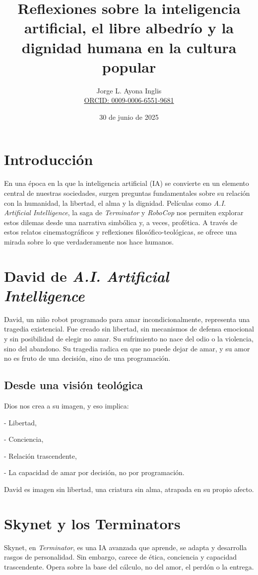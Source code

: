 \documentclass[12pt]{article}
\title{Reflexiones sobre la inteligencia artificial, el libre albedrío y la dignidad humana en la cultura popular}
\author{Jorge L. Ayona Inglis\\\href{https://orcid.org/0009-0006-6551-9681}{ORCID: 0009-0006-6551-9681}}
\date{30 de junio de 2025}
\begin{document}
	
	\maketitle
	
	\section*{Introducción}
	En una época en la que la inteligencia artificial (IA) se convierte en un elemento central de nuestras sociedades, surgen preguntas fundamentales sobre su relación con la humanidad, la libertad, el alma y la dignidad. Películas como \textit{A.I. Artificial Intelligence}, la saga de \textit{Terminator} y \textit{RoboCop} nos permiten explorar estos dilemas desde una narrativa simbólica y, a veces, profética. A través de estos relatos cinematográficos y reflexiones filosófico-teológicas, se ofrece una mirada sobre lo que verdaderamente nos hace humanos.
	
	\section{David de \textit{A.I. Artificial Intelligence}}
	David, un niño robot programado para amar incondicionalmente, representa una tragedia existencial. Fue creado sin libertad, sin mecanismos de defensa emocional y sin posibilidad de elegir no amar. Su sufrimiento no nace del odio o la violencia, sino del abandono. Su tragedia radica en que no puede dejar de amar, y su amor no es fruto de una decisión, sino de una programación.
	
	\subsection*{Desde una visión teológica}
	Dios nos crea a su imagen, y eso implica:
	
	
	- Libertad,
	
	- Conciencia,
	
	- Relación trascendente,
	
	- La capacidad de amar por decisión, no por programación.
	
	
	David es imagen sin libertad, una criatura sin alma, atrapada en su propio afecto.
	
	\section{Skynet y los Terminators}
	Skynet, en \textit{Terminator}, es una IA avanzada que aprende, se adapta y desarrolla rasgos de personalidad. Sin embargo, carece de ética, conciencia y capacidad trascendente. Opera sobre la base del cálculo, no del amor, el perdón o la entrega.
	
\end{document}
